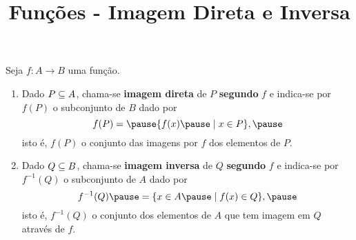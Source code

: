 \documentclass{beamer}
\title{Fun\c{c}\~oes - Imagem Direta e Inversa}
\author[\autor]{\autor}
\institute[\instituto]{\instituto}
\date{}
\begin{document}
    \begin{frame}
        \maketitle
    \end{frame}


    \begin{frame}
        \begin{definicao}
            Seja $f : A \to B$ \pause uma fun{\c c}{\~a}o.\pause
            \begin{enumerate}[label={\roman*})]
                \item Dado $P \subseteq A$, \pause chama-se \textbf{imagem direta} \pause de $P$ \pause \textbf{segundo} $f$ \pause e indica-se por $f(P)$ \pause o subconjunto de $B$ \pause dado por\pause
                \[
                    f(P) = \pause \{f(x) \pause \mid x \in P\},\pause
                \]
                isto {\'e}, \pause $f(P)$  o conjunto das imagens por $f$ \pause dos elementos de $P$.\pause

                \vspace{.5cm}

                \item Dado $Q \subseteq B$, \pause chama-se \textbf{imagem inversa} \pause de $Q$ \textbf{segundo} $f$ \pause e indica-se por \pause $f^{-1}(Q)$ \pause o subconjunto de $A$ \pause dado por\pause
                \[
                    f^{-1}(Q) \pause = \{x \in A \pause \mid f(x) \in Q\},\pause
                \]
                isto {\'e}, \pause $f^{-1}(Q)$  o conjunto dos elementos de $A$ \pause que tem imagem em $Q$ \pause atrav{\'e}s de $f$.\pause
            \end{enumerate}
        \end{definicao}
    \end{frame}
\end{document}
